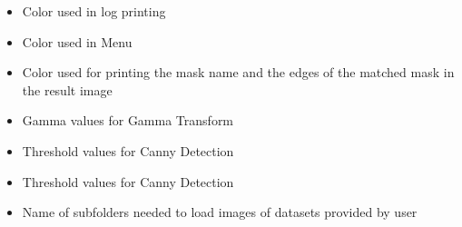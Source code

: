 \documentclass{article}
\begin{document}
\begin{itemize}
{\begin{itemize}
\item{Color used in log printing}
\item{Color used in Menu}
\item{Color used for printing the mask name and the edges of the matched mask in the result image}
\item{Gamma values for Gamma Transform}
\item{Threshold values for Canny Detection}
\item{Threshold values for Canny Detection}
\item{Name of subfolders needed to load images of datasets provided by user}
\end{itemize}
}
\end{itemize}
\end{document}
